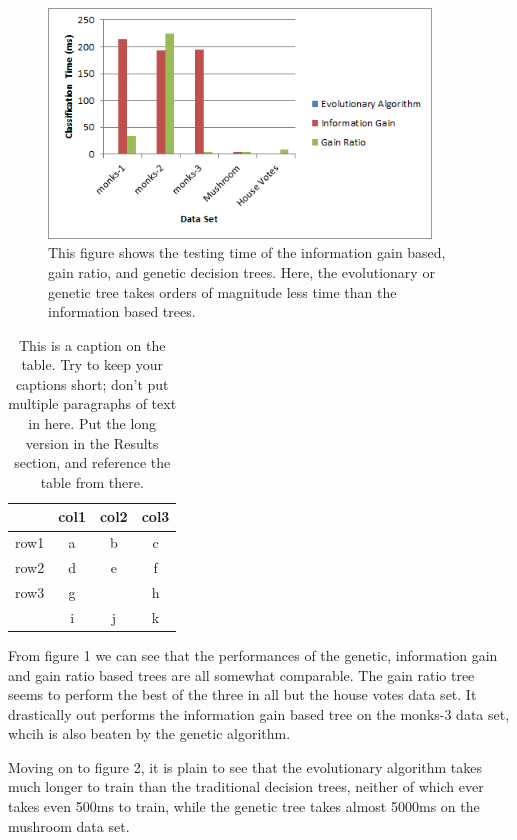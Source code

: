 \documentclass[12pt, letterpaper]{article}
\begin{document}
\begin{figure}[!htb]
\begin{center}
\includegraphics[width=4in]{images/algorithm_comparison_testing_time.png}
\end{center}
\caption{This figure shows the testing time of the information gain
based, gain ratio, and genetic decision trees.  Here, the evolutionary or 
genetic tree takes orders of magnitude less time than the information based
trees.}
\label{Testing Times of Multiple Decision Trees}
\end{figure}



\begin{table}
\begin{center}
\begin{tabular}{|c||c|cc}
\hline
& col1 & col2 & col3\\
\hline \hline
row1 & a & b & c\\
\hline 
row2 & d & e & f\\
\hline 
row3 & g &   & h\\
 & i & j & k\\
\hline 
\end{tabular}
\end{center}
\caption{This is a caption on the table.  Try to keep your captions short; don't
put multiple paragraphs of text in here.  Put the long version in the Results
section, and reference the table from there.}
\label{sometable}
\end{table}
From figure 1 we can see that the performances of the genetic, information
gain and gain ratio based trees are all somewhat comparable.  The gain ratio
tree seems to perform the best of the three in all but the house votes data set.
It drastically out performs the information gain based tree on the monks-3 data
set, whcih is also beaten by the genetic algorithm.

Moving on to figure 2, it is plain to see that the evolutionary algorithm
takes much longer to train than the traditional decision trees, neither of which
ever takes even 500ms to train, while the genetic tree takes almost 5000ms on 
the mushroom data set.
\end{document}

